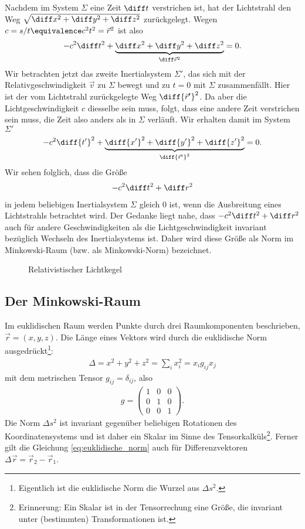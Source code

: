 Nachdem im System $\Sigma$ eine Zeit $\diff t$ verstrichen ist, hat der Lichtstrahl den Weg $\sqrt{\diff x^2+\diff y^2+\diff z^2}$ zurückgelegt.
Wegen $c=s/t\equivalence c^2 t^2 = \vec r^2$ ist also
\begin{align*}
    -c^2 \diff t^2+\underbrace{\diff x^2+\diff y^2+\diff z^2}_{\diff\vec r^2}=0.
\end{align*}
Wir betrachten jetzt das zweite Inertialsystem $\Sigma'$, das sich mit der Relativgeschwindigkeit $\vec v$ zu $\Sigma$ bewegt und zu $t=0$ mit $\Sigma$ zusammenfällt.
Hier ist der vom Lichtstrahl zurückgelegte Weg $\diff{\vec r'}^2$.
Da aber die Lichtgeschwindigkeit $c$ diesselbe sein muss, folgt, dass eine andere Zeit verstrichen sein muss, die Zeit also anders als in $\Sigma$ verläuft.
Wir erhalten damit im System $\Sigma'$
\begin{align*}
    -c^2 \diff{t'}^2+\underbrace{\diff{x'}^2+\diff{y'}^2+\diff{z'}^2}_{\diff{\vec r'}^2}=0.
\end{align*}
Wir sehen folglich, dass die Größe
\begin{align*}
    -c^2\diff t^2+\diff r^2
\end{align*}
in jedem beliebigen Inertialsystem $\Sigma$ gleich $0$ ist, wenn die Ausbreitung eines Lichtstrahls betrachtet wird.
Der Gedanke liegt nahe, dass $-c^2\diff t^2+\diff r^2$ auch für andere Geschwindigkeiten als die Lichtgeschwindigkeit invariant bezüglich Wechseln des Inertialsystems ist.
Daher wird diese Größe als Norm im Minkowski-Raum (bzw. als Minkowski-Norm) bezeichnet.


\begin{figure}[htb]
    \centering
    \tfigSRTLichtkegel
    \caption{Relativistischer Lichtkegel}
    \label{fig:srt_lichtkegel}
\end{figure}


\subsection{Der Minkowski-Raum}

Im euklidischen Raum werden Punkte durch drei Raumkomponenten beschrieben, $\vec r=(x,y,z)$.
Die Länge eines Vektors wird durch die euklidische Norm ausgedrückt\footnote{Eigentlich ist die euklidische Norm die Wurzel aus $\Delta s^2$.}:
\begin{align}
    \label{eq:euklidische_norm}
    \Delta=x^2+y^2+z^2=\sum_i x_i^2=x_ig_{ij}x_j
\end{align}
mit dem metrischen Tensor $g_{ij}=\delta_{ij}$, also
\begin{align*}
    g = \begin{pmatrix}
            1 & 0 & 0 \\
            0 & 1 & 0 \\
            0 & 0 & 1
        \end{pmatrix}.
\end{align*}
Die Norm $\Delta s^2$ ist invariant gegenüber beliebigen Rotationen des Koordinatensystems und ist daher ein Skalar im Sinne des Tensorkalküls\footnote{Erinnerung: Ein Skalar ist in der Tensorrechung eine Größe, die invariant unter (bestimmten) Transformationen ist. }.
Ferner gilt die Gleichung \eqref{eq:euklidische_norm} auch für Differenzvektoren $\Delta\vec r=\vec r_2-\vec r_1$.

